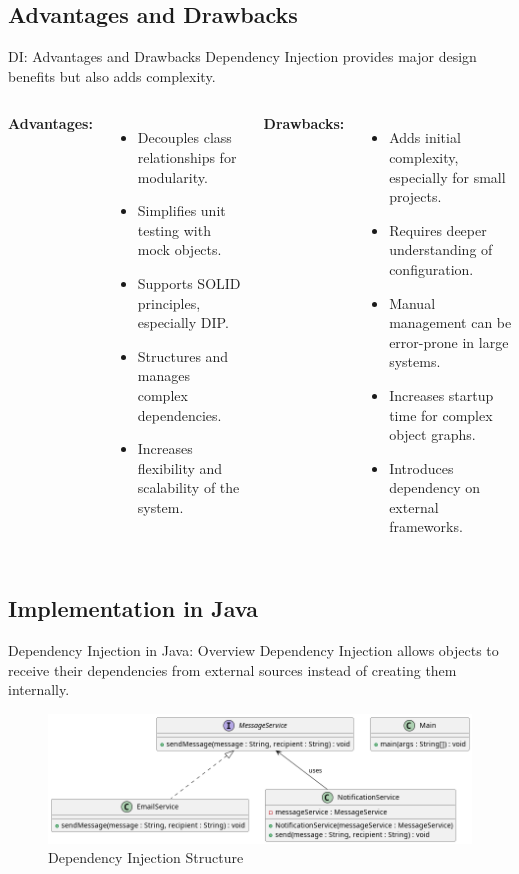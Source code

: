 \documentclass[aspectratio=169, table]{beamer}
\begin{document}
\subsection{Advantages and Drawbacks}
\begin{frame}[fragile]{DI: Advantages and Drawbacks}
	\vspace{20pt}
	Dependency Injection provides major design benefits but also adds complexity.
	
	\begin{columns}[T]
		\textbf{Advantages:}
		\begin{itemize}
			\item Decouples class relationships for modularity.
			\item Simplifies unit testing with mock objects.
			\item Supports SOLID principles, especially DIP.
			\item Structures and manages complex dependencies.
			\item Increases flexibility and scalability of the system.
		\end{itemize}
		
		\textbf{Drawbacks:}
		\begin{itemize}
			\item Adds initial complexity, especially for small projects.
			\item Requires deeper understanding of configuration.
			\item Manual management can be error-prone in large systems.
			\item Increases startup time for complex object graphs.
			\item Introduces dependency on external frameworks.
		\end{itemize}
	\end{columns}
\end{frame}

\subsection{Implementation in Java}
\begin{frame}[fragile]{Dependency Injection in Java: Overview}
	\vspace{20pt}
	Dependency Injection allows objects to receive their dependencies from external sources instead of creating them internally.
	
	\begin{figure}[h]
		\centering
		\includegraphics[width=.9\textwidth]{../../figures/out/dependency_injection.png}
		\caption{Dependency Injection Structure}
		\label{fig:dependency-injection}
	\end{figure}
\end{frame}
\end{document}
